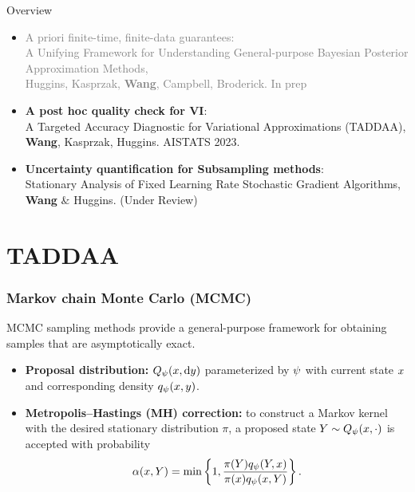 \documentclass[10pt,xcolor=table]{beamer}
\begin{document}
\begin{frame}{Overview}
	\begin{itemize}
		\item \textcolor{gray}{A priori finite-time, finite-data guarantees:\\
		A Unifying Framework for Understanding General-purpose Bayesian Posterior Approximation Methods, \\
		Huggins, Kasprzak, \textbf{Wang}, Campbell, Broderick. In prep} \pause
		\item \textbf{A post hoc quality check for VI}: \\A Targeted Accuracy Diagnostic for Variational Approximations (TADDAA), \textbf{Wang}, Kasprzak, Huggins. AISTATS 2023.
		\item \textbf{Uncertainty quantification for Subsampling methods}:\\
		Stationary Analysis of Fixed Learning Rate Stochastic Gradient Algorithms, \textbf{Wang} $\&$ Huggins. (Under Review)
	\end{itemize}
\end{frame}

\section{TADDAA}

\begin{frame}
  \frametitle{Markov chain Monte Carlo (MCMC) }
  MCMC sampling methods provide a general-purpose framework for obtaining samples that are asymptotically exact.
  \begin{itemize}
  \item \textbf{Proposal distribution:} $Q_{\psi}(x, {\mathrm{d}{y}})$ parameterized by $\psi$ with current state $x$ and corresponding density $q_{\psi}(x, y)$.
  \item \textbf{Metropolis--Hastings (MH) correction:} to construct a Markov kernel with the desired stationary distribution $\pi$, a proposed state 
$Y \sim Q_{\psi}(x, \cdot)$ 
is accepted with probability 
\[ \label{eq:MH-accept}
\alpha(x, Y) 
= \min \left\{1, \frac{\pi(Y) q_{\psi}(Y, x)}{\pi(x) q_{\psi}(x, Y)}\right\}. 
\]
  \end{itemize}
\end{frame}
\end{document}
